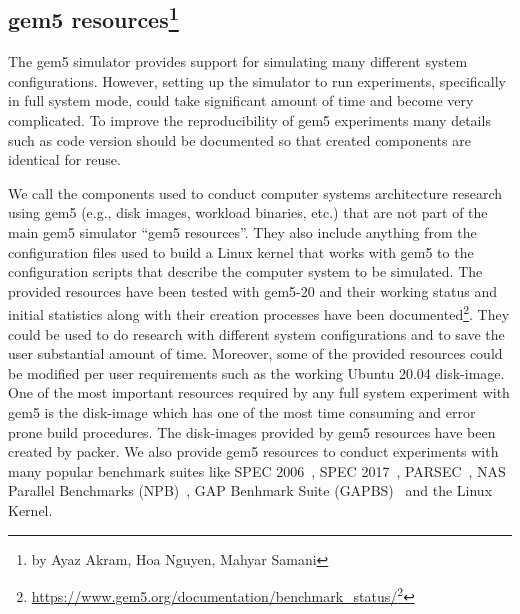 \subsection[gem5 resources]{gem5 resources\footnote{by Ayaz Akram, Hoa Nguyen, Mahyar Samani}}

The gem5 simulator provides support for simulating many different system configurations. However,
setting up the simulator to run experiments, specifically in full system mode, could take significant
amount of time and become very complicated. To improve the reproducibility of gem5 experiments
many details such as code version should be documented so that created components are identical for
reuse.

We call the components used to conduct computer systems architecture
research using gem5 (e.g., disk images, workload binaries, etc.) that are not part of the main gem5 simulator ``gem5 resources''. They also include anything from the configuration
files used to build a Linux kernel that works with gem5 to the configuration scripts that
describe the computer system to be simulated. The provided resources have been tested with gem5-20
and their working status and initial statistics along with their creation processes have been documented\footnote{\url{https://www.gem5.org/documentation/benchmark_status/}\footnote{\url{https://gem5.googlesource.com/public/gem5-resources}}}.
They could be used to do research with different system configurations and to save the user substantial amount of time.
Moreover, some of the provided resources could be modified per user requirements such as the working Ubuntu 20.04 disk-image.
One of the most important resources required by any full system experiment with gem5 is the disk-image
which has one of the most time consuming and error prone build procedures. The disk-images provided by
gem5 resources have been created by packer. We also provide gem5 resources to conduct experiments with many
popular benchmark suites like SPEC 2006~\cite{spec06}, SPEC 2017~\cite{spec17}, PARSEC~\cite{parsec},
NAS Parallel Benchmarks (NPB)~\cite{npb}, GAP Benhmark Suite (GAPBS)~\cite{gapbs} and the Linux Kernel.
